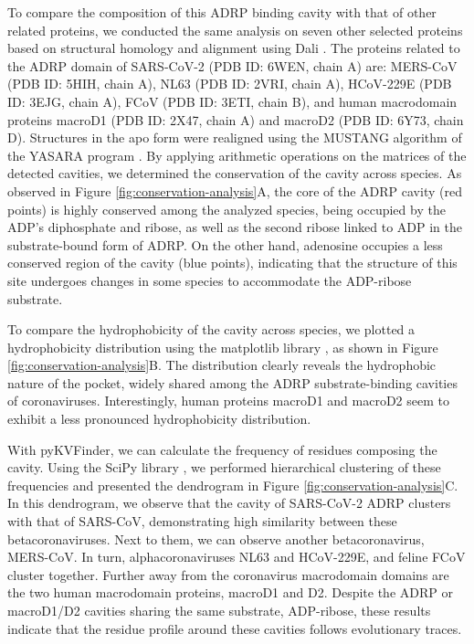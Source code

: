 \documentclass[Ingles]{phdthesis}
\begin{document}
To compare the composition of this ADRP binding cavity with that of other related proteins, we conducted the same analysis on seven other selected proteins based on structural homology and alignment using Dali \cite{dali}. The proteins related to the ADRP domain of SARS-CoV-2 (PDB ID: 6WEN, chain A) are: MERS-CoV (PDB ID: 5HIH, chain A), NL63 (PDB ID: 2VRI, chain A), HCoV-229E (PDB ID: 3EJG, chain A), FCoV (PDB ID: 3ETI, chain B), and human macrodomain proteins macroD1 (PDB ID: 2X47, chain A) and macroD2 (PDB ID: 6Y73, chain D). Structures in the apo form were realigned using the MUSTANG algorithm \cite{mustang} of the YASARA program \cite{yasara}. By applying arithmetic operations on the matrices of the detected cavities, we determined the conservation of the cavity across species. As observed in Figure \ref{fig:conservation-analysis}A, the core of the ADRP cavity (red points) is highly conserved among the analyzed species, being occupied by the ADP's diphosphate and ribose, as well as the second ribose linked to ADP in the substrate-bound form of ADRP. On the other hand, adenosine occupies a less conserved region of the cavity (blue points), indicating that the structure of this site undergoes changes in some species to accommodate the ADP-ribose substrate.

To compare the hydrophobicity of the cavity across species, we plotted a hydrophobicity distribution using the matplotlib library \cite{matplotlib}, as shown in Figure \ref{fig:conservation-analysis}B. The distribution clearly reveals the hydrophobic nature of the pocket, widely shared among the ADRP substrate-binding cavities of coronaviruses. Interestingly, human proteins macroD1 and macroD2 seem to exhibit a less pronounced hydrophobicity distribution.

With pyKVFinder, we can calculate the frequency of residues composing the cavity. Using the SciPy library \cite{scipy}, we performed hierarchical clustering of these frequencies and presented the dendrogram in Figure \ref{fig:conservation-analysis}C. In this dendrogram, we observe that the cavity of SARS-CoV-2 ADRP clusters with that of SARS-CoV, demonstrating high similarity between these betacoronaviruses. Next to them, we can observe another betacoronavirus, MERS-CoV. In turn, alphacoronaviruses NL63 and HCoV-229E, and feline FCoV cluster together. Further away from the coronavirus macrodomain domains are the two human macrodomain proteins, macroD1 and D2. Despite the ADRP or macroD1/D2 cavities sharing the same substrate, ADP-ribose, these results indicate that the residue profile around these cavities follows evolutionary traces.
\end{document}
